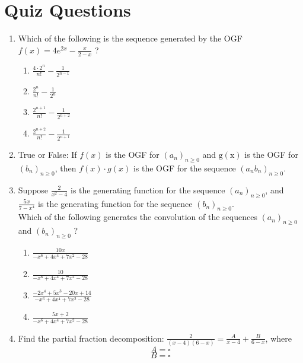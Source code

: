 \documentclass{article}
\theoremstyle{definition}
\begin{document}
\newpage

\section*{Quiz Questions}
\begin{enumerate}
  \item Which of the following is the sequence generated by the OGF $f(x)=4 e^{2 x}-\frac{x}{2-x}$ ?
  \begin{enumerate}
    \item $\frac{4 \cdot 2^n}{n!}-\frac{1}{2^{n-1}}$
    \item $\frac{2^n}{n!}-\frac{1}{2^n}$
    \item $\frac{2^{n+1}}{n!}-\frac{1}{2^{n+2}}$
    \item $\frac{2^{n+2}}{n!}-\frac{1}{2^{n+1}}$
  \end{enumerate}

  \item True or False: If $f(x)$ is the OGF for $\left(a_n\right)_{n \geq 0}$ and $\mathrm{g}(\mathrm{x})$ is the OGF for $\left(b_n\right)_{n \geq 0}$, then $f(x) \cdot g(x)$ is the OGF for the sequence $\left(a_n b_n\right)_{n \geq 0}$.
  

  \item Suppose $\frac{2}{x^2-4}$ is the generating function for the sequence $\left(a_n\right)_{n \geq 0}$, and $\frac{5 x}{7-x^4}$ is the generating function for the sequence $\left(b_n\right)_{n \geq 0}$.\\
  Which of the following generates the convolution of the sequences $\left(a_n\right)_{n \geq 0}$ and $\left(b_n\right)_{n \geq 0}$ ?
  \begin{enumerate}
    \item $\frac{10 x}{-x^6+4 x^4+7 x^2-28}$
    \item $\frac{10}{-x^6+4 x^4+7 x^2-28}$
    \item $\frac{-2 x^4+5 x^3-20 x+14}{-x^6+4 x^4+7 x^2-28}$
    \item $\frac{5 x+2}{-x^6+4 x^4+7 x^2-28}$
  \end{enumerate}

  \item Find the partial fraction decomposition: $\frac{2}{(x-4)(6-x)}=\frac{A}{x-4}+\frac{B}{6-x}$, where
  $$
  A=\square
  $$
  $$
  B=\square
  $$
\end{enumerate}





\newpage
\end{document}

